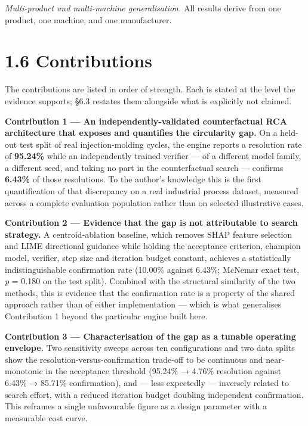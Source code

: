 \emph{Multi-product and multi-machine generalisation.} All results derive from one product, one machine, and one manufacturer.

\hypertarget{contributions}{%
\section{1.6 Contributions}\label{contributions}}

The contributions are listed in order of strength. Each is stated at the level the evidence supports; §6.3 restates them alongside what is explicitly not claimed.

\textbf{Contribution 1 --- An independently-validated counterfactual RCA architecture that exposes and quantifies the circularity gap.} On a held-out test split of real injection-molding cycles, the engine reports a resolution rate of \textbf{95.24\%} while an independently trained verifier --- of a different model family, a different seed, and taking no part in the counterfactual search --- confirms \textbf{6.43\%} of those resolutions. To the author's knowledge this is the first quantification of that discrepancy on a real industrial process dataset, measured across a complete evaluation population rather than on selected illustrative cases.

\textbf{Contribution 2 --- Evidence that the gap is not attributable to search strategy.} A centroid-ablation baseline, which removes SHAP feature selection and LIME directional guidance while holding the acceptance criterion, champion model, verifier, step size and iteration budget constant, achieves a statistically indistinguishable confirmation rate (10.00\% against 6.43\%; McNemar exact test, \emph{p} = 0.180 on the test split). Combined with the structural similarity of the two methods, this is evidence that the confirmation rate is a property of the shared approach rather than of either implementation --- which is what generalises Contribution 1 beyond the particular engine built here.

\textbf{Contribution 3 --- Characterisation of the gap as a tunable operating envelope.} Two sensitivity sweeps across ten configurations and two data splits show the resolution-versus-confirmation trade-off to be continuous and near-monotonic in the acceptance threshold (95.24\% → 4.76\% resolution against 6.43\% → 85.71\% confirmation), and --- less expectedly --- inversely related to search effort, with a reduced iteration budget doubling independent confirmation. This reframes a single unfavourable figure as a design parameter with a measurable cost curve.

